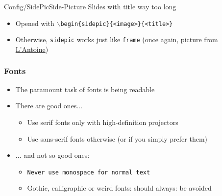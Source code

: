 
\begin{sidepic}{Config/SidePic}{Side-Picture Slides with title way too long}
\begin{itemize}
    \item Opened with \texttt{$\backslash$begin\{sidepic\}\{<image>\}\{<title>\}}
    \item Otherwise, \texttt{sidepic} works just like \texttt{frame}
    (once again, picture from \href{https://www.shutterstock.com/en/g/lantoine}{L'Antoine})
\end{itemize}
\end{sidepic}


\begin{frame}
\frametitle{Fonts}
\begin{itemize}
    \item The paramount task of fonts is being readable
    \item There are good ones...
      \begin{itemize}
          \item {\textrm{Use serif fonts only with high-definition projectors}}
          \item {\textsf{Use sans-serif fonts otherwise (or if you simply prefer them)}}
      \end{itemize}
    \item ... and not so good ones:
    \begin{itemize}
        \item {\texttt{Never use monospace for normal text}}
        \item {\frakfamily Gothic, calligraphic or weird fonts: should always: be avoided}
\end{itemize}
\end{itemize}
\end{frame}


